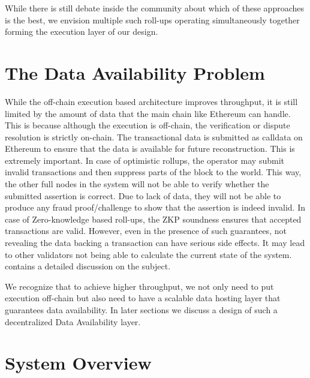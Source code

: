 \documentclass[sigconf, screen=true, nonacm]{acmart}
\begin{document}
    While there is still debate inside the community about which of these approaches is the best, we envision multiple such roll-ups operating simultaneously together forming the execution layer of our design. 

\section{The Data Availability Problem} 
    While the off-chain execution based architecture improves throughput, it is still limited by the amount of data that the main chain like Ethereum can handle. This is because although the execution is off-chain, the verification or dispute resolution is strictly on-chain. The transactional data is submitted as calldata on Ethereum to ensure that the data is available for future reconstruction. This is extremely important. In case of optimistic rollups, the operator may submit invalid transactions and then suppress parts of the block to the world. This way, the other full nodes in the system will not be able to verify whether the submitted assertion is correct. Due to lack of data, they will not be able to produce any fraud proof/challenge to show that the assertion is indeed invalid. In case of Zero-knowledge based roll-ups, the ZKP soundness ensures that accepted transactions are valid. However, even in the presence of such guarantees, not revealing the data backing a transaction can have serious side effects. It may lead to other validators not being able to calculate the current state of the system. \cite{EthWiki:2018} contains a detailed discussion on the subject. 

    We recognize that to achieve higher throughput, we not only need to put execution off-chain but also need to have a scalable data hosting layer that guarantees data availability. In later sections we discuss a design of such a decentralized Data Availability layer. 

\section{System Overview}
\end{document}
